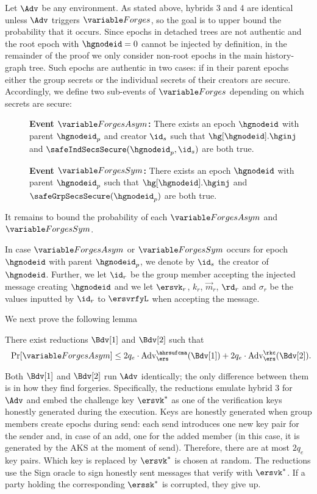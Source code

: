 Let $\Adv$ be any environment. As stated above, hybrids 3 and 4 are identical unless $\Adv$ triggers $\forges$, so the goal is to upper bound the probability that it occurs. %
Since epochs in detached trees are not authentic and the root epoch with $\hgnodeid=0$ cannot be injected by definition, in the remainder of the proof we only consider non-root epochs in the main history-graph tree.
Such epochs are authentic in two cases: if in their parent epochs either the group secrets or the individual secrets of their creators are secure. Accordingly, we define two sub-events of $\forges$ depending on which secrets are secure:
\begin{description}
  \item[] {\bf Event $\forgesa$: } There exists an epoch $\hgnodeid$ with parent $\hgnodeid_p$ and creator $\id_s$ such that $\hg[\hgnodeid].\hginj$ and $\safeIndSecsSecure(\hgnodeid_p, \id_s)$ are both true.
  \item[] {\bf Event $\forgess$: } There exists an epoch $\hgnodeid$ with parent $\hgnodeid_p$ such that $\hg[\hgnodeid].\hginj$ and $\safeGrpSecsSecure(\hgnodeid_p)$ are both true.
\end{description}
It remains to bound the probability of each $\forgesa$ and $\forgess$.

In case $\forgesa$ or $\forgess$ occurs for epoch $\hgnodeid$ with parent $\hgnodeid_p$, we denote by $\id_s$ the creator of $\hgnodeid$. Further, we let $\id_r$ be the group member accepting the injected message creating $\hgnodeid$ and we let $\ersvk_r$, $k_r$, $\vec m_r$, $\rd_r$ and $\sigma_r$ be the values inputted by $\id_r$ to $\ersvrfyL$ when accepting the message.

We next prove the following lemma
\begin{lemma}
There exist reductions $\Bdv[1]$ and $\Bdv[2]$ such that
\begin{equation*}
    \Pr[\forgesa] \leq 2q_e\cdot \textnormal{Adv}^{\ahrsufcma}_\ers(\Bdv[1]) + 2q_e\cdot \textnormal{Adv}^\rkc_\ers(\Bdv[2]).
\end{equation*}
\end{lemma}

Both $\Bdv[1]$ and $\Bdv[2]$ run $\Adv$ identically; the only difference between them is in how they find forgeries. Specifically, the reductions emulate hybrid 3 for $\Adv$ and embed the challenge key $\ersvk^*$ as one of the verification keys honestly generated during the execution. Keys are honestly generated when group members create epochs during send: each send introduces one new key pair for the sender and, in case of an add, one for the added member (in this case, it is generated by the AKS at the moment of send). Therefore, there are at most $2q_e$ key pairs.
Which key is replaced by $\ersvk^*$ is chosen at random. The reductions use the Sign oracle to sign honestly sent messages that verify with $\ersvk^*$. If a party holding the corresponding $\erssk^*$ is corrupted, they give up.

